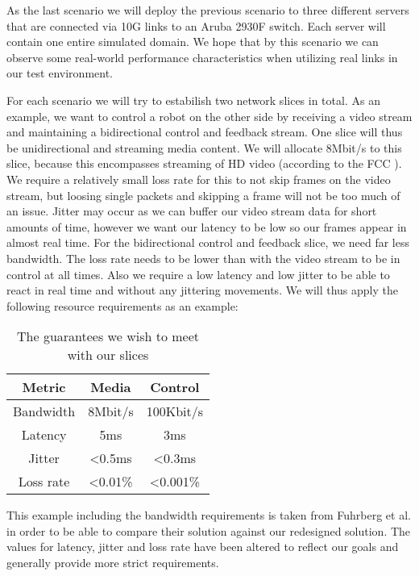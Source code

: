 \documentclass{article}
\begin{document}
As the last scenario we will deploy the previous scenario to three different servers that are connected via 10G links to an Aruba 2930F switch. Each server will contain one entire simulated domain. We hope that by this scenario we can observe some real-world performance characteristics when utilizing real links in our test environment.

For each scenario we will try to estabilish two network slices in total. As an example, we want to control a robot on the other side by receiving a video stream and maintaining a bidirectional control and feedback stream. One slice will thus be unidirectional and streaming media content. We will allocate 8Mbit/s to this slice, because this encompasses streaming of HD video (according to the FCC \cite{fcc}). We require a relatively small loss rate for this to not skip frames on the video stream, but loosing single packets and skipping a frame will not be too much of an issue. Jitter may occur as we can buffer our video stream data for short amounts of time, however we want our latency to be low so our frames appear in almost real time. For the bidirectional control and feedback slice, we need far less bandwidth. The loss rate needs to be lower than with the video stream to be in control at all times. Also we require a low latency and low jitter to be able to react in real time and without any jittering movements. We will thus apply the following resource requirements as an example:

\begin{table}[h]
    \centering
    \begin{tabular}{ |c|c|c| }
    \hline
    Metric & Media & Control \\
    \hline
         Bandwidth & 8Mbit/s & 100Kbit/s \\
         Latency   & 5ms     & 3ms      \\
         Jitter    & \textless 0.5ms  & \textless 0.3ms   \\
         Loss rate & \textless 0.01\% & \textless 0.001\% \\
    \hline
    \end{tabular}
    \caption{The guarantees we wish to meet with our slices}
    \label{table:1}
\end{table}

This example including the bandwidth requirements is taken from Fuhrberg et al. \cite{SE4} in order to be able to compare their solution against our redesigned solution. The values for latency, jitter and loss rate have been altered to reflect our goals and generally provide more strict requirements.
\end{document}
